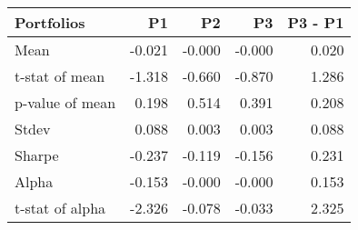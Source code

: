 \begin{tabular}{lrrrr}
\toprule
Portfolios & P1 & P2 & P3 & P3 - P1 \\
\midrule
Mean & -0.021 & -0.000 & -0.000 & 0.020 \\
t-stat of mean & -1.318 & -0.660 & -0.870 & 1.286 \\
p-value of mean & 0.198 & 0.514 & 0.391 & 0.208 \\
Stdev & 0.088 & 0.003 & 0.003 & 0.088 \\
Sharpe & -0.237 & -0.119 & -0.156 & 0.231 \\
Alpha & -0.153 & -0.000 & -0.000 & 0.153 \\
t-stat of alpha & -2.326 & -0.078 & -0.033 & 2.325 \\
\bottomrule
\end{tabular}
